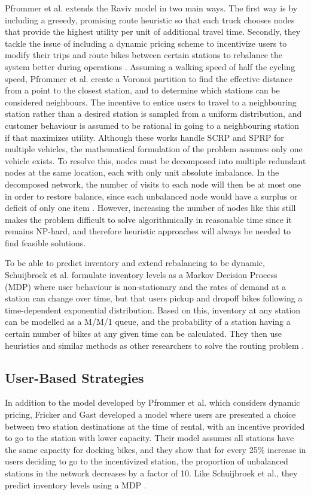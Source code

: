 \documentclass[conference]{IEEEtran}
\begin{document}
Pfrommer et al. extends the Raviv model in two main ways. The first way is by including a greeedy, promising route heuristic so that each truck chooses nodes that provide the highest utility per unit of additional travel time. Secondly, they tackle the issue of including a dynamic pricing scheme to incentivize users to modify their trips and route bikes between certain stations to rebalance the system better during operations \cite{pfrommer}. Assuming a walking speed of half the cycling speed, Pfrommer et al. create a Voronoi partition to find the effective distance from a point to the closest station, and to determine which stations can be considered neighbours. The incentive to entice users to travel to a neighbouring station rather than a desired station is sampled from a uniform distribution, and customer behaviour is assumed to be rational in going to a neighbouring station if that maximizes utility. Although these works handle SCRP and SPRP for multiple vehicles, the mathematical formulation of the problem assumes only one vehicle exists. To resolve this, nodes must be decomposed into multiple redundant nodes at the same location, each with only unit absolute imbalance. In the decomposed network, the number of visits to each node will then be at most one in order to restore balance, since each unbalanced node would have a surplus or deficit of only one item \cite{pal_zhang}. However, increasing the number of nodes like this still makes the problem difficult to solve algorithmically in reasonable time since it remains NP-hard, and therefore heuristic approaches will always be needed to find feasible solutions.

To be able to predict inventory and extend rebalancing to be dynamic, Schuijbroek et al. formulate inventory levels as a Markov Decision Process (MDP) where user behaviour is non-stationary and the rates of demand at a station can change over time, but that users pickup and dropoff bikes following a time-dependent exponential distribution. Based on this, inventory at any station can be modelled as a M/M/1 queue, and the probability of a station having a certain number of bikes at any given time can be calculated. They then use heuristics and similar methods as other researchers to solve the routing problem \cite{schuijbroek}.

\subsection{User-Based Strategies}
In addition to the model developed by Pfrommer et al. which considers dynamic pricing, Fricker and Gast developed a model where users are presented a choice between two station destinations at the time of rental, with an incentive provided to go to the station with lower capacity. Their model assumes all stations have the same capacity for docking bikes, and they show that for every 25\% increase in users deciding to go to the incentivized station, the proportion of unbalanced stations in the network decreases by a factor of 10. Like Schuijbroek et al., they predict inventory levels using a MDP \cite{fricker}.
\end{document}
